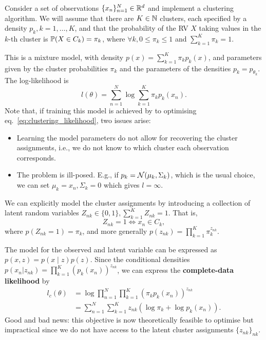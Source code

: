 \begin{example}[Clustering]
Consider a set of observations $\{x_n\}_{n=1}^N\in\R^d$ and implement a clustering algorithm. We will assume that there are $K\in\N$ clusters, each specified by a density $p_k, k=1,\ldots, K$, and that the probability of the RV $X$ taking values in the $k$-th cluster is $\P(X\in C_k) = \pi_k$, where $\forall k, 0\leq \pi_k \leq 1$ and $\sum_{k=1}^K \pi_k = 1$. 

This is a mixture model, with density $p(x)=\sum_{k=1}^K \pi_k p_k(x)$, and parameters given by the cluster probabilities $\pi_k$ and the parameters of the densities $p_k = p_{\theta_k}$. The log-likelihood is 
\begin{equation}
	l(\theta) = \sum_{n=1}^N \log \sum_{k=1}^K \pi_k p_k(x_n). \label{eq:clustering_likelihood}
\end{equation}
Note that, if training this model is achieved by to optimising eq.~\eqref{eq:clustering_likelihood}, two issues arise:  
\begin{itemize}
	\item Learning the model parameters do not allow for recovering the cluster assignments, i.e., we do not know to which cluster each observation corresponds.
	\item The problem is ill-posed. E.g., if $p_k=\cN(\mu_k,\Sigma_k)$, which is the usual choice, we can set $\mu_k=x_n, \Sigma_k=0$ which gives $l=\infty$.
\end{itemize}	

We can explicitly model the cluster assignments by introducing a collection of latent random variables $Z_{nk}\in\{0,1\}, \sum_{k=1}^{K} Z_{nk} = 1$. That is, 
\begin{equation}
	Z_{nk} = 1 \iff x_n\in C_k,
\end{equation}
where $p(Z_{nk} = 1) = \pi_k$, and more generally $p(z_{nk}) = \prod_{k=1}^{K} \pi_k^{z_{nk}}$.

The model for the observed and latent variable can be expressed as $p(x,z) = p(x\mid z)p(z)$. Since the conditional densities $p(x_n|z_{nk}) = \prod_{k=1}^K (p_k(x_n))^{z_{nk}}$, we can express the \textbf{complete-data likelihood} by
\begin{align}
	\label{eq:ch1_clustering_completeloglike}
	l_c(\theta) 
	&= \log \prod_{n=1}^N\prod_{k=1}^K (\pi_kp_k(x_n))^{z_{nk}} \nonumber \\
	& = \sum_{n=1}^N\sum_{k=1}^K z_{nk} (\log  \pi_k + \log  p_k(x_n)).
\end{align}
Good and bad news: this objective is now theoretically feasible to optimise but impractical since we do not have access to the latent cluster assignments $\{z_{nk}\}_{nk}$.   


\end{example}

